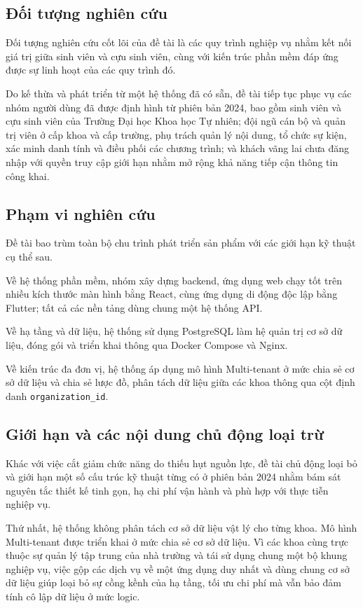 \documentclass[12pt,a4paper,oneside]{report}
\begin{document}
\subsection{Đối tượng nghiên cứu}

Đối tượng nghiên cứu cốt lõi của đề tài là các quy trình nghiệp vụ nhằm kết nối giá trị giữa sinh viên và cựu sinh viên, cùng với kiến trúc phần mềm đáp ứng được sự linh hoạt của các quy trình đó.

Do kế thừa và phát triển từ một hệ thống đã có sẵn, đề tài tiếp tục phục vụ các nhóm người dùng đã được định hình từ phiên bản 2024, bao gồm sinh viên và cựu sinh viên của Trường Đại học Khoa học Tự nhiên; đội ngũ cán bộ và quản trị viên ở cấp khoa và cấp trường, phụ trách quản lý nội dung, tổ chức sự kiện, xác minh danh tính và điều phối các chương trình; và khách vãng lai chưa đăng nhập với quyền truy cập giới hạn nhằm mở rộng khả năng tiếp cận thông tin công khai.

\subsection{Phạm vi nghiên cứu}

Đề tài bao trùm toàn bộ chu trình phát triển sản phẩm với các giới hạn kỹ thuật cụ thể sau.

Về hệ thống phần mềm, nhóm xây dựng backend, ứng dụng web chạy tốt trên nhiều kích thước màn hình bằng React, cùng ứng dụng di động độc lập bằng Flutter; tất cả các nền tảng dùng chung một hệ thống API.

Về hạ tầng và dữ liệu, hệ thống sử dụng PostgreSQL làm hệ quản trị cơ sở dữ liệu, đóng gói và triển khai thông qua Docker Compose và Nginx.

Về kiến trúc đa đơn vị, hệ thống áp dụng mô hình Multi-tenant ở mức chia sẻ cơ sở dữ liệu và chia sẻ lược đồ, phân tách dữ liệu giữa các khoa thông qua cột định danh \texttt{organization\_id}.

\subsection{Giới hạn và các nội dung chủ động loại trừ}

Khác với việc cắt giảm chức năng do thiếu hụt nguồn lực, đề tài chủ động loại bỏ và giới hạn một số cấu trúc kỹ thuật từng có ở phiên bản 2024 nhằm bám sát nguyên tắc thiết kế tinh gọn, hạ chi phí vận hành và phù hợp với thực tiễn nghiệp vụ.

Thứ nhất, hệ thống không phân tách cơ sở dữ liệu vật lý cho từng khoa. Mô hình Multi-tenant được triển khai ở mức chia sẻ cơ sở dữ liệu. Vì các khoa cùng trực thuộc sự quản lý tập trung của nhà trường và tái sử dụng chung một bộ khung nghiệp vụ, việc gộp các dịch vụ về một ứng dụng duy nhất và dùng chung cơ sở dữ liệu giúp loại bỏ sự cồng kềnh của hạ tầng, tối ưu chi phí mà vẫn bảo đảm tính cô lập dữ liệu ở mức logic.
\end{document}
